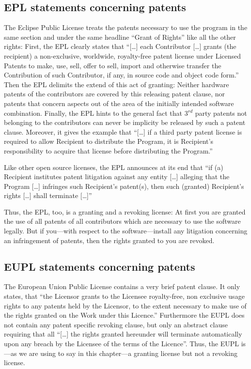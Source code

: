 \subsection{EPL statements concerning patents}

The Eclipse Public License treats the patents necessary to use the program
in the same section and under the same headline \enquote{Grant of Rights} like
all the other rights: First, the EPL clearly states that \enquote{[\ldots] each
Contributor [\ldots] grants (the recipient) a non-exclusive, worldwide,
royalty-free patent license under Licensed Patents to make, use, sell, offer to
sell, import and otherwise transfer the Contribution of such Contributor, if
any, in source code and object code form.} Then the EPL delimits
the extend of this act of granting: Neither hardware patents of the contributors
are covered by this releasing patent clause, nor patents that concern aspects
out of the area of the initially intended software combination.
Finally, the EPL hints to the general fact that 3$^{rd}$ party patents not
belonging to the contributors can never be implicity be released by such a
patent clause. Moreover, it gives the example that \enquote{[\ldots] if a third
party patent license is required to allow Recipient to distribute the Program,
it is Recipient's responsibility to acquire that license before distributing the
Program.}

Like other open source licenses, the EPL announces at its end that
\enquote{if (a) Recipient institutes patent litigation against any entity
[\ldots] alleging that the Program [\ldots] infringes such Recipient's
patent(s), then such (granted) Recipient's rights [\ldots] shall terminate
[\ldots]}

Thus, the EPL, too, is a granting and a revoking license: 
At first you are granted the use of all patents of all
contributors which are necessary to use the software legally. But if you---with
respect to the software---install any litigation concerning an infringement of
patents, then the rights granted to you are revoked.

\subsection{EUPL statements concerning patents}

The European Union Public License contains a very brief patent clause. It only
states, that \enquote{the Licensor grants to the Licensee royalty-free, non
exclusive usage rights to any patents held by the Licensor, to the extent
necessary to make use of the rights granted on the Work under this
Licence.}
Furthermore the EUPL does not contain any patent specific revoking clause, but
only an abstract clause requiring that all \enquote{[\ldots] the rights granted
hereunder will terminate automatically upon any breach by the Licensee of the
terms of the Licence}. Thus, the EUPL is---as we are using to say
in this chapter---a granting license but not a revoking license.

